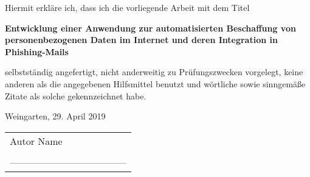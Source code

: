 
\thispagestyle{empty} %

Hiermit erkläre ich, dass ich die vorliegende Arbeit mit dem Titel   %
\begin{center}
\textbf{Entwicklung einer Anwendung zur automatisierten Beschaffung von personenbezogenen Daten im Internet und deren Integration in Phishing-Mails}
\end{center}
selbstständig angefertigt, nicht anderweitig zu Prüfungszwecken vorgelegt, keine anderen als die angegebenen Hilfsmittel benutzt und wörtliche sowie sinngemäße Zitate als solche gekennzeichnet habe.\newline  %

\begin{flushleft}
Weingarten, 29. April 2019 %
\end{flushleft}

\begin{tabular}{l}   
Autor Name        \\%
 \\
------------------------------------ \\
\end{tabular}




